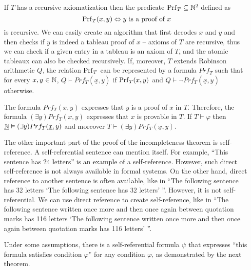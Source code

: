 If $T$ has a recursive axiomatization then the predicate $\operatorname{Prf}_T \subseteq \mathbb{N}^2$ defined as $$\operatorname{Prf}_T(x, y) \Leftrightarrow y \text{ is a proof of } x$$ is recursive. We can easily create an algorithm that first decodes $x$ and $y$ and then checks if $y$ is indeed a tableau proof of $x$ -- axioms of $T$ are recursive, thus we can check if a given entry in a tableau is an axiom of $T$, and the atomic tableaux can also be checked recursively. If, moreover, $T$ extends Robinson arithmetic $Q$, the relation $\operatorname{Prf}_T$ can be represented by a formula $Prf_T$ such that for every $x, y \in \mathbb{N}$, $Q \vdash Prf_T(\underline{x}, \underline{y})$ if $\operatorname{Prf}_T(x,y)$ and $Q \vdash \neg Prf_T(\underline{x}, \underline{y})$ otherwise.

The formula $Prf_T(x,y)$ expresses that $y$ is a proof of $x$ in $T$. Therefore, the formula $(\exists y)Prf_T(x, y)$ expresses that $x$ is provable in $T$. If $T \vdash \varphi$ then $\underline{\mathbb{N}} \vDash (\exists y)Prf_T(\underline{x}, y)$ and moreover $T \vdash (\exists y)Prf_T(\underline{x}, y)$.

The other important part of the proof of the incompleteness theorem is self-reference. A self-referential sentence can mention itself. For example, ``This sentence has 24 letters'' is an example of a self-reference. However, such direct self-reference is not always available in formal systems. On the other hand, direct reference to another sentence is often available, like in ``The following sentence has 32 letters `The following sentence has 32 letters' ''. However, it is not self-referential. We can use direct reference to create self-reference, like in ``The following sentence written once more and then once again between quotation marks has 116 letters `The following sentence written once more and then once again between quotation marks has 116 letters' ''.

Under some assumptions, there is a self-referential formula $\psi$ that expresses ``this formula satisfies condition $\varphi$'' for any condition $\varphi$, as demonstrated by the next theorem.

